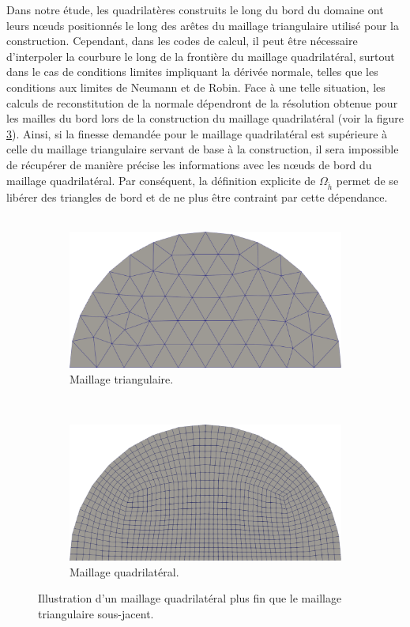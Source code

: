 Dans notre étude, les quadrilatères construits le long du bord du domaine ont leurs nœuds positionnés le long des arêtes du maillage triangulaire utilisé pour la construction. Cependant, dans les codes de calcul, il peut être nécessaire d'interpoler la courbure le long de la frontière du maillage quadrilatéral, surtout dans le cas de conditions limites impliquant la dérivée normale, telles que les conditions aux limites de Neumann et de Robin. Face à une telle situation, les calculs de reconstitution de la normale dépendront de la résolution obtenue pour les mailles du bord lors de la construction du maillage quadrilatéral (voir la figure \ref{fig:mail_tri_vs_mail_quad}). Ainsi, si la finesse demandée pour le maillage quadrilatéral est supérieure à celle du maillage triangulaire servant de base à la construction, il sera impossible de récupérer de manière précise les informations avec les nœuds de bord du maillage quadrilatéral. Par conséquent, la définition explicite de $\Omega_{\tilde{h}}$ permet de se libérer des triangles de bord et de ne plus être contraint par cette dépendance.\\\\
\begin{figure}[h!]
\centering
\begin{subfigure}{0.6\textwidth}
    \includegraphics[width=\textwidth]{images/non_hermite_mesh_tri.pdf}
    \caption{Maillage triangulaire.}
    \label{fig:mail_tri_vs_mail_quad_1}
\end{subfigure}
\\[0.5cm]
\begin{subfigure}{0.6\textwidth}
    \includegraphics[width=\textwidth]{images/non_hermite_quad.pdf}
    \caption{Maillage quadrilatéral.}
    \label{fig:mail_tri_vs_mail_quad_2}
\end{subfigure}
\caption{Illustration d'un maillage quadrilatéral plus fin que le maillage triangulaire sous-jacent.}
\label{fig:mail_tri_vs_mail_quad}
\end{figure}
